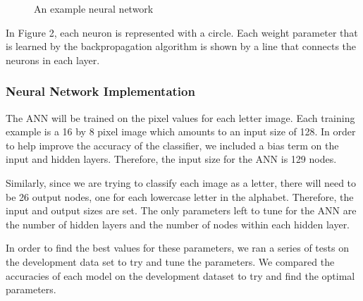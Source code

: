 \documentclass[11pt,a4paper,twocolumn]{article}
\begin{document}
\begin{figure}[h]
\centering
\caption{An example neural network}
\end{figure}

In Figure 2, each neuron is represented with a circle. Each weight parameter that is learned by the
backpropagation algorithm is shown by a line that connects the neurons in each layer.

\subsubsection*{Neural Network Implementation}

The ANN will be trained on the pixel values for each letter image. Each training example is a 16 by
8 pixel image which amounts to an input size of 128. In order to help improve the accuracy of the
classifier, we included a bias term on the input and hidden layers. Therefore, the input size for
the ANN is 129 nodes.

Similarly, since we are trying to classify each image as a letter, there will need to be 26 output
nodes, one for each lowercase letter in the alphabet. Therefore, the input and output sizes are set.
The only parameters left to tune for the ANN are the number of hidden layers and the number of nodes
within each hidden layer.

In order to find the best values for these parameters, we ran a series of tests on the development
data set to try and tune the parameters. We compared the accuracies of each model on the development
dataset to try and find the optimal parameters.
\end{document}
